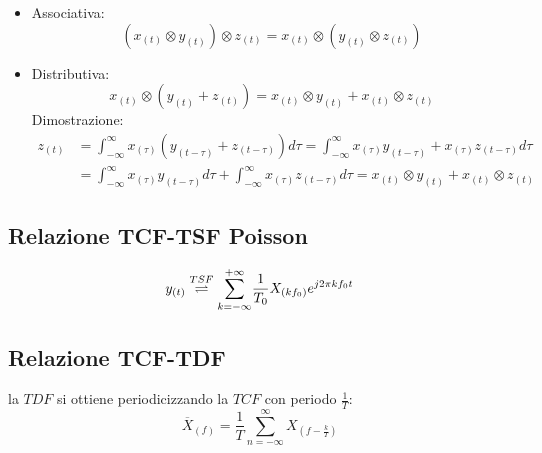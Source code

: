 \begin{itemize}
{\begin{itemize}
{\begin{align}
                                            &= \int_{-\infty}^{\infty} y_{(\tau^\prime)}x_{(t-\tau^\prime)} d\tau^\prime = y_{(t)} \otimes  x_{(t)}\nonumber 
                                \end{align}
                            }
                        \item {
                                Associativa:
                                \[
                                    (x_{(t)} \otimes  y_{(t)}) \otimes z_{(t)}  =x_{(t)} \otimes  (y_{(t)} \otimes z_{(t)})   
                                \]
                            }
                        \item {
                                Distributiva:
                                \[
                                    x_{(t)} \otimes  (y_{(t)}+z_{(t)}) = x_{(t)}\otimes  y_{(t)} +x_{(t)}\otimes  z_{(t)}  
                                \]
                                Dimostrazione:
                                \begin{align}
                                    z_{(t)} &= \int_{-\infty}^{\infty} x_{(\tau)}(y_{(t-\tau)}+z_{(t-\tau)}) d\tau = \int_{-\infty}^{\infty}x_{(\tau)}y_{(t-\tau)} +x_{(\tau)}z_{(t-\tau)} d\tau \nonumber \\
                                            &= \int_{-\infty}^{\infty}x_{(\tau)}y_{(t-\tau)} d\tau +\int_{-\infty}^{\infty}x_{(\tau)}z_{(t-\tau)} d\tau = x_{(t)}\otimes  y_{(t)} +x_{(t)}\otimes  z_{(t)} \nonumber 
                                \end{align}
                            }
                    \end{itemize}
                }
            \end{itemize}
        \subsection{Relazione TCF-TSF Poisson}
            \[
                y_{(t)} \overset{TSF}{\rightleftharpoons}\overunderset{+\infty}{k = -\infty}{\sum} \frac{1}{T_0} X_{(kf_0)} e^{j2\pi kf_0t}    
            \]
        \subsection{Relazione TCF-TDF}
            la $TDF$ si ottiene periodicizzando la $TCF$ con periodo $\frac{1}{T}$:
            \[
                \overline{X}_{(f)} = \frac{1}{T} \sum_{n=-\infty}^{\infty} X_{(f-\frac{k}{T})} 
            \] 
